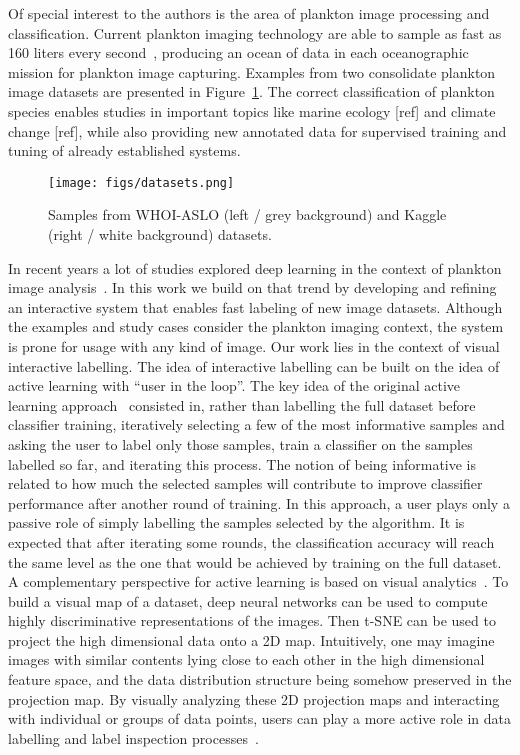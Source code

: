 \documentclass[sn-basic]{sn-jnl}%
\theoremstyle{thmstyleone}%
\theoremstyle{thmstyletwo}%
\theoremstyle{thmstylethree}%
\begin{document}
Of special interest to the authors is the area of plankton image processing and classification. Current plankton imaging technology are able to sample as fast as 160 liters every second~\citep{cowen-paper-isiis}, producing an ocean of data in each oceanographic mission for plankton image capturing. Examples from two consolidate plankton image datasets are presented in Figure~\ref{fig:datasets}. The correct classification of plankton species enables studies in important topics like marine ecology [ref] and climate change [ref], while also providing new annotated data for supervised training and tuning of already established systems.

\begin{figure}
\centerline{\texttt{[image: figs/datasets.png]}}
\caption{Samples from WHOI-ASLO (left / grey background) and Kaggle (right / white background) datasets.}
\label{fig:datasets}
\end{figure}

In recent years a lot of studies explored deep learning in the context of plankton image analysis~\citep{luo-paper2018,dai-zooplanktonet,sms-lowshot,qi-lowshot,lumini-paper,orenstein-transferlearning, wwwpic-oceans21}. In this work we build on that trend by developing and refining an interactive system that enables fast labeling of new image datasets. Although the examples and study cases consider the plankton imaging context, the system is prone for usage with any kind of image. Our work lies in the context of visual interactive labelling. The idea of interactive labelling can be built on the idea of active learning with ``user in the loop''. The key idea of the original active learning approach~\citep{settles-book} consisted in, rather than labelling the full dataset before classifier training, iteratively selecting a few of the most informative samples and asking the user to label only those samples, train a classifier on the samples labelled so far, and iterating this process. The notion of being informative is related to how much the selected samples will contribute to improve classifier performance after another round of training. In this approach, a user plays only a passive role of simply labelling the samples selected by the algorithm. It is expected that after iterating some rounds, the classification accuracy will reach the same level as the one that would be achieved by training on the full dataset. A complementary perspective for active learning is based on visual analytics~\citep{wong-paper-va}. To build a visual map of a dataset, deep neural networks can be used to compute highly discriminative representations of the images. Then t-SNE can be used to project the high dimensional data onto a 2D map. Intuitively, one may imagine images with similar contents lying close to each other in the high dimensional feature space, and the data distribution structure being somehow preserved in the projection map. By visually analyzing these 2D projection maps and interacting with individual or groups of data points, users can play a more active role in data labelling and label inspection processes~\citep{bernard-paper-vial}.
\end{document}
